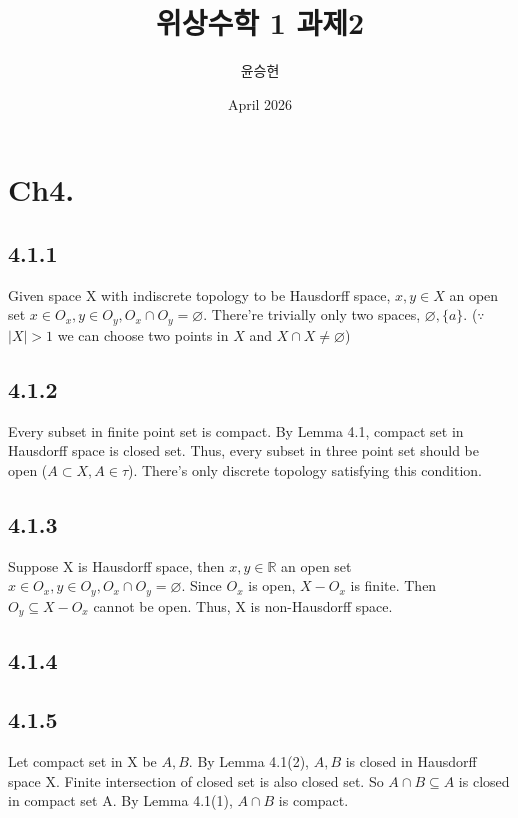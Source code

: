 \documentclass{article}
\title{위상수학 1 과제2}
\author{윤승현}
\date{April 2026}
\let\emptyset\varnothing
\begin{document}
\maketitle

\section*{Ch4.}

\subsection*{4.1.1}

Given space X with indiscrete topology to be Hausdorff space, $x,y\in X$ an open set $x\in O_x, y\in O_y, O_x \cap O_y = \emptyset$. There're trivially only two spaces, $\emptyset, \{a\}$. ($\because$ $|X|>1$ we can choose two points in $X$ and $X \cap X\neq \emptyset$)

\subsection*{4.1.2}

Every subset in finite point set is compact. By Lemma 4.1, compact set in Hausdorff space is closed set. Thus, every subset in three point set should be open ($A \subset X, A\in \tau$). There's only discrete topology satisfying this condition.

\subsection*{4.1.3}

Suppose X is Hausdorff space, then $x,y \in \mathbb{R}$ an open set $x\in O_x, y\in O_y, O_x \cap O_y = \emptyset$. Since $O_x$ is open, $X-O_x$ is finite. Then $O_y \subseteq X-O_x $ cannot be open. Thus, X is non-Hausdorff space.

\subsection*{4.1.4}






\subsection*{4.1.5}

Let compact set in X be $A, B$. By Lemma 4.1(2), $A, B$ is closed in Hausdorff space X. Finite intersection of closed set is also closed set. So $A \cap B \subseteq A$ is closed in compact set A. By Lemma 4.1(1), $A \cap B$ is compact.
\end{document}
